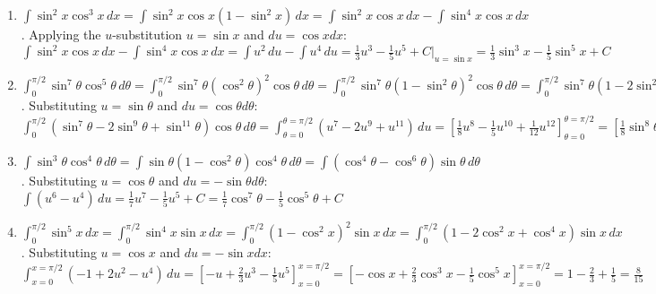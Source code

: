 \begin{Answer}[ref = power_1]
\begin{enumerate}
\item $\int \sin^2{x} \cos^3{x}\,dx = \int \sin^2{x} \cos{x} \left( 1 - \sin^2{
x} \right)\,dx = \int \sin^2{x} \cos{x}\,dx - \int \sin^4{x} \cos{x}\,dx$. 
Applying the $u$-substitution $u = \sin{x}$ and $du = \cos{x}dx$: $\int \sin^2{
x} \cos{x}\,dx - \int \sin^4{x} \cos{x}\,dx = \int u^2\,du - \int u^4\,du = 
\frac{1}{3}u^3 - \frac{1}{5}u^5 + C|_{u = \sin{x}} = \frac{1}{3}\sin^3{x} - 
\frac{1}{5}\sin^5{x} + C$
\item $\int_0^{\pi/2} \sin^7{\theta} \cos^5{\theta}\,d\theta = \int_0^{\pi/2} 
\sin^7{\theta} \left( \cos^2{\theta} \right)^2 \cos{\theta}\,d\theta = \int_0^{
\pi/2} \sin^7{\theta} \left( 1 - \sin^2{\theta} \right)^2 \cos{\theta}\,d\theta
= \int_0^{\pi/2} \sin^7{\theta} \left( 1 - 2\sin^2{\theta} + \sin^4{\theta} 
\right) \cos{\theta}\,d\theta = \int_0^{\pi/2} \left( \sin^7{\theta} - 2\sin^9{
\theta} + \sin^{11}{\theta} \right) \cos{\theta}\,d\theta$. Substituting $u = 
\sin{\theta}$ and $du = \cos{\theta} d\theta$: $\int_0^{\pi/2} \left( \sin^7{
\theta} - 2\sin^9{\theta} + \sin^{11}{\theta} \right) \cos{\theta}\,d\theta = 
\int_{\theta = 0}^{\theta = \pi/2} \left( u^7 - 2u^9 + u^{11} \right)\,du = 
\left[ \frac{1}{8}u^8 - \frac{1}{5}u^{10} + \frac{1}{12}u^{12} \right]_{\theta 
= 0}^{\theta = \pi/2} = \left[ \frac{1}{8}\sin^8{\theta} - \frac{1}{5}\sin^{10
}{\theta} + \frac{1}{12}\sin^{12}{\theta} \right]_{\theta = 0}^{\theta = \pi/2}
= \frac{1}{8} - \frac{1}{5} + \frac{1}{12} = \frac{1}{120}$
\item $\int \sin^3{\theta} \cos^4{\theta}\,d\theta = \int \sin{\theta} \left( 
1 - \cos^2{\theta} \right) \cos^4{\theta}\,d\theta = \int \left( \cos^4{\theta}
- \cos^6{\theta} \right)\sin{\theta}\,d\theta$. Substituting $u = \cos{\theta}$
and $du = -\sin{\theta} d\theta$: $\int \left( u^6 - u^4 \right)\,du = \frac{1
}{7}u^7 - \frac{1}{5}u^5 + C= \frac{1}{7}\cos^7{\theta} - \frac{1}{5}\cos^5{
\theta} + C$
\item $\int_0^{\pi/2} \sin^5{x}\,dx = \int_0^{\pi/2} \sin^4{x} \sin{x}\,dx = 
\int_0^{\pi/2} \left( 1 - \cos^2{x} \right)^2 \sin{x}\,dx = \int_0^{\pi/2} 
\left( 1 - 2\cos^2{x} + \cos^4{x} \right) \sin{x}\,dx$. Substituting $u = \cos{
x}$ and $du = -\sin{x} dx$: $\int_{x = 0}^{x = \pi/2} \left( -1 + 2u^2 - u^4 
\right)\,du = \left[ -u + \frac{2}{3}u^3 - \frac{1}{5}u^5 \right]_{x = 0}^{x = 
\pi/2} = \left[ -\cos{x} + \frac{2}{3}\cos^3{x} - \frac{1}{5}\cos^5{x} \right]_
{x = 0}^{x = \pi/2} = 1 - \frac{2}{3} + \frac{1}{5} = \frac{8}{15}$

\end{enumerate}
\end{Answer}
